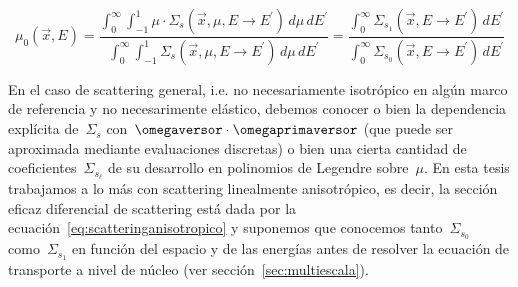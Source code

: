 \begin{definicion}
\begin{equation}\label{eq:mu0}
 \mu_0(\vec{x}, E) =
\frac{\displaystyle \int_0^\infty \int_{-1}^{1} \mu \cdot \Sigma_{s}(\vec{x}, \mu, E \rightarrow E^{\prime}) \, d\mu \, dE^\prime}
     {\displaystyle \int_0^\infty \int_{-1}^{1}           \Sigma_{s}(\vec{x}, \mu, E \rightarrow E^{\prime}) \, d\mu \, dE^\prime}
=
\frac{\displaystyle \int_0^\infty           \Sigma_{s_1}(\vec{x}, E \rightarrow E^{\prime}) \, dE^\prime}
     {\displaystyle \int_0^\infty           \Sigma_{s_0}(\vec{x}, E \rightarrow E^{\prime}) \, dE^\prime}
\end{equation}
\end{definicion}


\medskip

En el caso de scattering general, i.e. no necesariamente isotrópico en algún marco de referencia y no necesarimente elástico, debemos conocer o bien la dependencia explícita de~$\Sigma_s$ con~$\omegaversor \cdot \omegaprimaversor$ (que puede ser aproximada mediante evaluaciones discretas) o bien una cierta cantidad de coeficientes~$\Sigma_{s_\ell}$ de su desarrollo en polinomios de Legendre sobre~$\mu$. En esta tesis trabajamos a lo más con scattering linealmente anisotrópico, es decir, la sección eficaz diferencial de scattering está dada por la ecuación~\eqref{eq:scatteringanisotropico} y suponemos que conocemos tanto~$\Sigma_{s_0}$ como~$\Sigma_{s_1}$ en función del espacio y de las energías antes de resolver la ecuación de transporte a nivel de núcleo (ver sección~\ref{sec:multiescala}).

% 
% 
% 
% 
% 


